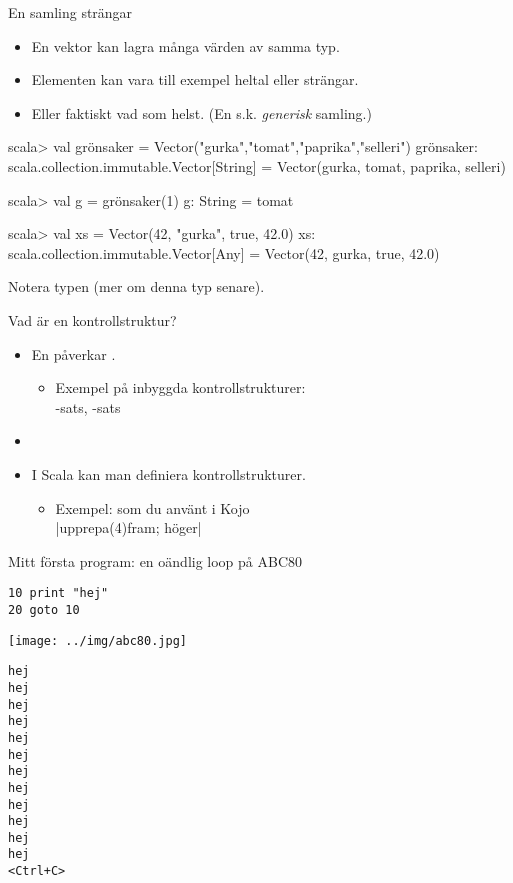 \begin{Slide}{En samling strängar}

\begin{itemize}
\item En vektor kan lagra många värden av samma typ.
\item Elementen kan vara till exempel heltal eller strängar.
\item Eller faktiskt vad som helst. (En s.k. \emph{generisk} samling.)
\end{itemize}

\begin{REPL}
scala> val grönsaker = Vector("gurka","tomat","paprika","selleri")
grönsaker: scala.collection.immutable.Vector[String] =
  Vector(gurka, tomat, paprika, selleri)

scala> val g = grönsaker(1)
g: String = tomat

scala> val xs = Vector(42, "gurka", true, 42.0)
xs: scala.collection.immutable.Vector[Any] = Vector(42, gurka, true, 42.0)
\end{REPL}
Notera typen  (mer om denna typ senare).
\end{Slide}

\begin{Slide}{Vad är en kontrollstruktur?}
\begin{itemize}
\item En  påverkar .
\begin{itemize}
\item[] Exempel på inbyggda kontrollstrukturer:
\\\vspace{0.5em}-sats, -sats
\end{itemize}

\item[]

\item I Scala kan man definiera  kontrollstrukturer.
\begin{itemize}
\item[] Exempel:  som du använt i Kojo
\\\vspace{0.5em}\code|upprepa(4){fram; höger}|
\end{itemize}
\end{itemize}
\end{Slide}

\ifkompendium\else
\begin{Slide}{Mitt första program: en oändlig loop på ABC80}
\begin{minipage}{0.8\textwidth}
\begin{verbatim}
10 print "hej"
20 goto 10
\end{verbatim}
\texttt{[image: ../img/abc80.jpg]}
\end{minipage}%
\begin{minipage}{0.2\textwidth}
\pause
\begin{verbatim}
hej
hej
hej
hej
hej
hej
hej
hej
hej
hej
hej
hej
<Ctrl+C>
\end{verbatim}
\end{minipage}
\end{Slide}
\fi

